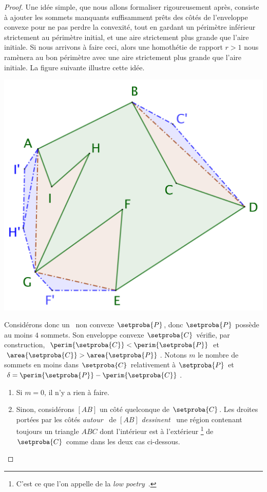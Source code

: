 \begin{proof}
	Une idée simple, que nous allons formaliser rigoureusement après, consiste à ajouter les sommets manquants suffisamment prêts des côtés de l'enveloppe convexe pour ne pas perdre la convexité, tout en gardant un périmètre inférieur strictement au périmètre initial, et une aire strictement plus grande que l'aire initiale. Si nous arrivons à faire ceci, alors une homothétie de rapport $r > 1$ nous ramènera au bon périmètre avec une aire strictement plus grande que l'aire initiale.
	La figure suivante illustre cette idée.	
	
	\begin{center}
		\includegraphics[scale=.4]{content/polygon/convex-hull-distortion.png}
	\end{center}


	Considérons donc un \ngone\ non convexe $\setproba{P}$, donc $\setproba{P}$ possède au moins $4$ sommets.
	Son enveloppe convexe $\setproba{C}$ vérifie, par construction,
	$\perim{\setproba{C}} < \perim{\setproba{P}}$ 
	et 
	$\area{\setproba{C}} > \area{\setproba{P}}$.
	Notons $m$ le nombre de sommets en moins dans $\setproba{C}$ relativement à $\setproba{P}$ et
	$\delta = \perim{\setproba{P}} - \perim{\setproba{C}}$.
	\begin{enumerate}
		\item \label{add-vertex-start}
		Si $m = 0$, il n'y a rien à faire. 

		\item Sinon, considérons $[AB]$ un côté quelconque de $\setproba{C}$.
		Les droites portées par les côtés \og \emph{autour} \fg\ de $[AB]$ \og \emph{dessinent} \fg\ une région contenant toujours un triangle $ABC$ dont l'intérieur est à l'extérieur
		\footnote{
			C'est ce que l'on appelle de la \og \emph{low poetry} \fg\,.
		}
		de $\setproba{C}$ comme dans les deux cas ci-dessous.
		\begin{multicols}{2}
			\centering


\end{multicols}
\end{enumerate}
\end{proof}
